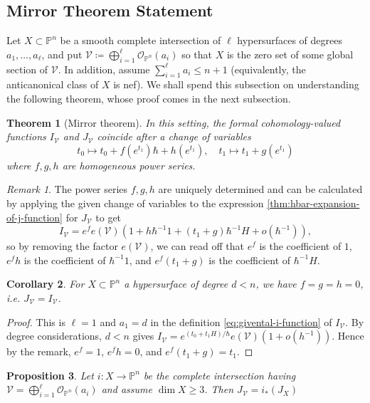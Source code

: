 \documentclass{report}
\theoremstyle{plain}
\newtheorem{theorem}{Theorem}[section]
\newtheorem{proposition}[theorem]{Proposition}
\newtheorem{corollary}[theorem]{Corollary}
\theoremstyle{definition}
\theoremstyle{remark}
\newtheorem*{remark}{Remark}
\newcommand{\bP}{\mathbb{P}}
\newcommand{\cO}{\mathcal{O}}
\newcommand{\cV}{\mathcal{V}}
\begin{document}
\subsection{Mirror Theorem Statement}

Let $X \subset \bP^n$ be a smooth complete intersection of $\ell$
hypersurfaces of degrees $a_1, \ldots, a_\ell$, and put $\cV \coloneqq
\bigoplus_{i=1}^\ell \cO_{\bP^n}(a_i)$ so that $X$ is the zero set of
some global section of $\cV$. In addition, assume $\sum_{i=1}^\ell a_i
\le n+1$ (equivalently, the anticanonical class of $X$ is nef). We
shall spend this subsection on understanding the following theorem,
whose proof comes in the next subsection.

\begin{theorem}[Mirror theorem] \cite[Theorem 9.1]{Givental1996} \cite[Theorem 11.2.2]{Cox1999} \label{thm:givental-mirror-theorem}
  In this setting, the formal cohomology-valued functions $I_{\cV}$
  and $J_{\cV}$ coincide after a change of variables
  \[ t_0 \mapsto t_0 + f(e^{t_1})\hbar + h(e^{t_1}), \quad t_1 \mapsto t_1 + g(e^{t_1}) \]
  where $f, g, h$ are homogeneous power series.
\end{theorem}

\begin{remark}
  The power series $f, g, h$ are uniquely determined and can be
  calculated by applying the given change of variables to the
  expression \ref{thm:hbar-expansion-of-j-function} for $J_{\cV}$ to
  get
  \[ I_{\cV} = e^f e(\cV)(1 + h \hbar^{-1} 1 + (t_1 + g) \hbar^{-1} H + o(\hbar^{-1})), \]
  so by removing the factor $e(\cV)$, we can read off that $e^f$ is
  the coefficient of $1$, $e^f h$ is the coefficient of $\hbar^{-1}
  1$, and $e^f (t_1 + g)$ is the coefficient of $\hbar^{-1} H$.
\end{remark}

\begin{corollary}
  For $X \subset \bP^n$ a hypersurface of degree $d < n$, we have $f =
  g = h = 0$, i.e. $J_{\cV} = I_{\cV}$.
\end{corollary}

\begin{proof}
  This is $\ell = 1$ and $a_1 = d$ in the definition
  \eqref{eq:givental-i-function} of $I_{\cV}$. By degree
  considerations, $d < n$ gives $I_{\cV} = e^{(t_0 + t_1H)/\hbar}
  e(\cV)(1 + o(h^{-1}))$. Hence by the remark, $e^f = 1$, $e^f h = 0$,
  and $e^f(t_1 + g) = t_1$.
\end{proof}

\begin{proposition} \label{thm:relation-between-givental-j-functions}
  Let $i\colon X \to \bP^n$ be the complete intersection having $\cV =
  \bigoplus_{i=1}^\ell \cO_{\bP^n}(a_i)$ and assume $\dim X \ge 3$.
  Then $J_{\cV} = i_*(J_X)$
\end{proposition}
\end{document}
